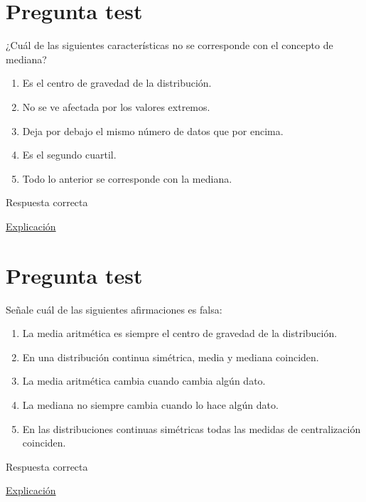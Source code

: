 \documentclass[
]{book}
\providecommand{\tightlist}{%
  \setlength{\itemsep}{0pt}\setlength{\parskip}{0pt}}
\begin{document}
\hypertarget{pregunta-test-65}{%
\section{Pregunta test}\label{pregunta-test-65}}

¿Cuál de las siguientes características no se corresponde con el concepto de mediana?

\begin{enumerate}
\def\labelenumi{\alph{enumi})}
\tightlist
\item
  Es el centro de gravedad de la distribución.
\item
  No se ve afectada por los valores extremos.
\item
  Deja por debajo el mismo número de datos que por encima.
\item
  Es el segundo cuartil.
\item
  Todo lo anterior se corresponde con la mediana.
\end{enumerate}

Respuesta correcta

\href{https://1fjmanzano.github.io/bioestadistica/medidas-de-posicio\%CC\%81n-dispersio\%CC\%81n-y-forma.html\#medidas-de-posicio\%CC\%81n-centrales}{Explicación}

\hypertarget{pregunta-test-66}{%
\section{Pregunta test}\label{pregunta-test-66}}

Señale cuál de las siguientes afirmaciones es falsa:

\begin{enumerate}
\def\labelenumi{\alph{enumi})}
\tightlist
\item
  La media aritmética es siempre el centro de gravedad de la distribución.
\item
  En una distribución continua simétrica, media y mediana coinciden.
\item
  La media aritmética cambia cuando cambia algún dato.
\item
  La mediana no siempre cambia cuando lo hace algún dato.
\item
  En las distribuciones continuas simétricas todas las medidas de centralización coinciden.
\end{enumerate}

Respuesta correcta

\href{https://www.statisticshowto.com/what-is-a-bimodal-distribution/}{Explicación}
\end{document}
